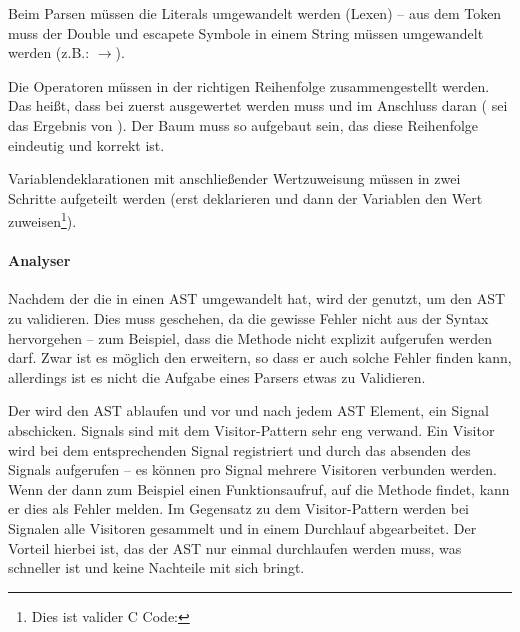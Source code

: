 {        Beim Parsen müssen die Literals umgewandelt werden (Lexen) -- aus dem Token  muss der Double  und escapete Symbole in einem String müssen umgewandelt werden (z.B.: $\rightarrow$).

        Die Operatoren müssen in der richtigen Reihenfolge zusammengestellt werden. Das heißt, dass bei  zuerst  ausgewertet werden muss und im Anschluss daran  ( sei das Ergebnis von ). Der Baum muss so aufgebaut sein, das diese Reihenfolge eindeutig und korrekt ist.

        Variablendeklarationen mit anschließender Wertzuweisung müssen in zwei Schritte aufgeteilt werden (erst deklarieren und dann der Variablen den Wert zuweisen\footnote{
          Dies ist valider C Code: 
        }).

      \paragraph{Analyser}
        Nachdem der  die  in einen AST umgewandelt hat, wird der  genutzt, um den AST zu validieren. Dies muss geschehen, da die gewisse Fehler nicht aus der Syntax hervorgehen -- zum Beispiel, dass die  Methode nicht explizit aufgerufen werden darf. Zwar ist es möglich den  erweitern, so dass er auch solche Fehler finden kann, allerdings ist es nicht die Aufgabe eines Parsers etwas zu Validieren.

        Der  wird den AST ablaufen und vor und nach jedem AST Element, ein Signal abschicken. Signals sind mit dem Visitor-Pattern \autocite[S.366]{Gamma:1995:DPE:186897} sehr eng verwand. Ein Visitor wird bei dem entsprechenden Signal registriert und durch das absenden des Signals aufgerufen -- es können pro Signal mehrere Visitoren verbunden werden. Wenn der  dann zum Beispiel einen Funktionsaufruf, auf die  Methode findet, kann er dies als Fehler melden. Im Gegensatz zu dem Visitor-Pattern werden bei Signalen alle Visitoren gesammelt und in einem Durchlauf abgearbeitet. Der Vorteil hierbei ist, das der AST nur einmal durchlaufen werden muss, was schneller ist und keine Nachteile mit sich bringt.

}
